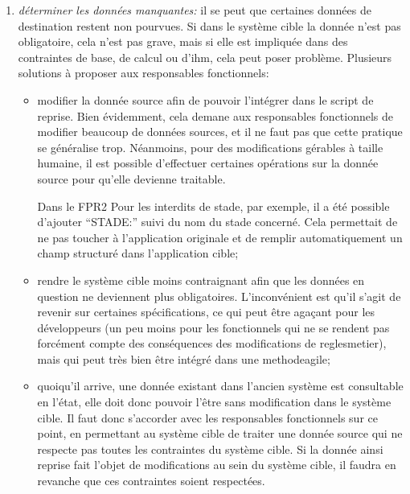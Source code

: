 \documentclass{book}
\begin{document}
\begin{enumerate}
\begin{enumerate}
\begin{itemize}
    \item de reprendre dans un champ libre de type ``précisions'';
    \item d'enrichir un référentiel de destination si cela résout le problème;
    \item de prévoir un champ structuré supplémentaire dans le système cible;
   \end{itemize}
  \end{enumerate}
  \item \textit{déterminer les données manquantes:} il se peut que certaines données de destination restent non pourvues. Si dans le système cible la donnée n'est pas obligatoire, cela n'est pas grave, mais si elle est impliquée dans des contraintes de base, de calcul ou d'\gls{ihm}, cela peut poser problème. Plusieurs solutions à proposer aux responsables \gls{fonctionnels}:
  \begin{itemize}
   \item modifier la donnée source afin de pouvoir l'intégrer dans le script de reprise. Bien évidemment, cela demane aux responsables \gls{fonctionnels} de modifier beaucoup de données sources, et il ne faut pas que cette pratique se généralise trop. Néanmoins, pour des modifications gérables à taille humaine, il est possible d'effectuer certaines opérations sur la donnée source pour qu'elle devienne traitable.
  \begin{bclogo}[arrondi = 0.1, couleur = blue!10, logo = \bcinfo]{Dans le FPR2}
Pour les interdits de stade, par exemple, il a été possible d'ajouter ``STADE:'' suivi du nom du stade concerné. Cela permettait de ne pas toucher à l'application originale et de remplir automatiquement un champ structuré dans l'application cible;
  \end{bclogo}
   \item rendre le système cible moins contraignant afin que les données en question ne deviennent plus obligatoires. L'inconvénient est qu'il s'agit de revenir sur certaines spécifications, ce qui peut être agaçant pour les développeurs (un peu moins pour les \gls{fonctionnels} qui ne se rendent pas forcément compte des conséquences des modifications de \gls{reglesmetier}), mais qui peut très bien être intégré dans une \gls{methodeagile};
   \item quoiqu'il arrive, une donnée existant dans l'ancien système est consultable en l'état, elle doit donc pouvoir l'être sans modification dans le système cible. Il faut donc s'accorder avec les responsables \gls{fonctionnels} sur ce point, en permettant au système cible de traiter une donnée source qui ne respecte pas toutes les contraintes du système cible. Si la donnée ainsi reprise fait l'objet de modifications au sein du système cible, il faudra en revanche que ces contraintes soient respectées.

\end{itemize}
\end{enumerate}
\end{document}
